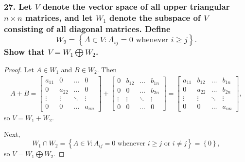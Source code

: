 \documentclass{article}
\begin{document}
\subsubsection*{27. Let $V$ denote the vector space of all upper triangular $n \times n$ matrices, and let $W_1$ denote the subspace of $V$ consisting of all diagonal matrices. Define \[W_2 = \left\{A \in V: A_{ij} = 0 \text{ whenever } i \ge j\right\}.\] Show that $V = W_1 \bigoplus W_2$.}
\begin{proof}
	Let $A \in W_1$ and $B \in W_2$. Then
	\begin{align*}
		A + B = 
		\begin{bmatrix}
			a_{11} & 0 & \hdots & 0 \\
			0 & a_{22} & \hdots & 0 \\
			\vdots & \vdots & \ddots & \vdots \\
			0 & 0 & \hdots & a_{nn}
		\end{bmatrix} +
		\begin{bmatrix}
			0 & b_{12} & \hdots & b_{1n} \\
			0 & 0 & \hdots & b_{2n} \\
			\vdots & \vdots & \ddots & \vdots \\
			0 & 0 & \hdots & 0
		\end{bmatrix} =
		\begin{bmatrix}
			a_{11} & b_{12} & \hdots & b_{1n} \\
			0 & a_{22} & \hdots & b_{2n} \\
			\vdots & \vdots & \ddots & \vdots \\
			0 & 0 & \hdots & a_{nn}
		\end{bmatrix},
	\end{align*}
	so $V = W_1 + W_2$.

	Next, \[ W_1 \cap W_2 = \left\{A \in V: A_{ij} = 0 \text{ whenever } i \ge j \text{ or } i \ne j\right\} = \left\{0\right\}, \]
	so $V = W_1 \bigoplus W_2$.
\end{proof}
\end{document}
